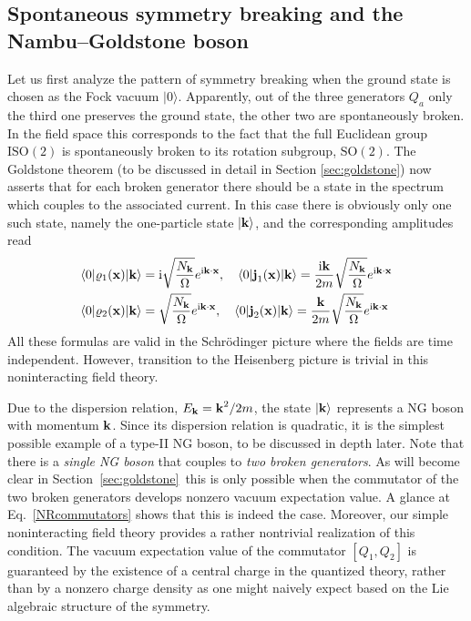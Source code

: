 \documentclass[final,3p,times,12pt,a4paper,sort&compress]{elsarticle}
\newcommand\gr[1]{\mathrm{#1}}              %
\newcommand\vek[1]{{\boldsymbol{\bf #1}}}   %
\newcommand\skal[2]{\vek{#1}\cdot\vek{#2}}  %
\newcommand\bra[1]{\langle#1\vert}          %
\newcommand\ket[1]{\vert#1\rangle}          %
\newcommand\imag{\mathrm i}                 %
\newcommand\vr{\varrho}
\begin{document}
\subsection{Spontaneous symmetry breaking and the Nambu--Goldstone boson}
Let us first analyze the pattern of symmetry breaking when the ground state is
chosen as the Fock vacuum $\ket0$. Apparently, out of the three generators $Q_a$
only the third one preserves the ground state, the other two are spontaneously
broken. In the field space this corresponds to the fact that the full Euclidean
group $\gr{ISO(2)}$ is spontaneously broken to its rotation subgroup,
$\gr{SO(2)}$. The Goldstone theorem (to be discussed in detail in Section
\ref{sec:goldstone}) now asserts that for each broken generator
there should be a state in the spectrum which couples to the associated current.
In this case there is obviously only one such state, namely the one-particle
state $\ket{\vek k}$, and the corresponding amplitudes read
\begin{equation}
\begin{split}
\bra0\vr_1(\vek x)\ket{\vek k}&=\imag
\sqrt{\frac{N_{\vek k}}{\Omega}}e^{\imag\skal kx},\quad
\bra0\vek j_1(\vek x)\ket{\vek k}=\frac{\imag\vek k}{2m}
\sqrt{\frac{N_{\vek k}}{\Omega}}e^{\imag\skal kx}\\
\bra0\vr_2(\vek x)\ket{\vek k}&=
\sqrt{\frac{N_{\vek k}}{\Omega}}e^{\imag\skal kx},\quad
\bra0\vek j_2(\vek x)\ket{\vek k}=\frac{\vek k}{2m}
\sqrt{\frac{N_{\vek k}}{\Omega}}e^{\imag\skal kx}
\end{split}
\end{equation}
All these formulas are valid in the Schr\"odinger picture where the fields are
time independent. However, transition to the Heisenberg picture is trivial in
this noninteracting field theory.

Due to the dispersion relation, $E_{\vek k}=\vek k^2/2m$, the state $\ket{\vek
k}$ represents a NG boson with momentum $\vek k$. Since its dispersion relation
is quadratic, it is the simplest possible example of a type-II NG boson,
to be discussed in depth later. Note that there is a \emph{single NG boson}
that couples to \emph{two broken generators}. As will become clear in
Section~\ref{sec:goldstone}\ this is only possible when the commutator of the
two broken generators develops nonzero vacuum expectation value. A glance at
Eq.~\eqref{NRcommutators} shows that this is indeed the case. Moreover, our
simple noninteracting field theory provides a rather nontrivial realization of
this condition. The vacuum expectation value of the commutator
$[Q_1,Q_2]$ is guaranteed by the existence of a central charge in the quantized
theory, rather than by a nonzero charge density as one might naively expect
based on the Lie algebraic structure of the symmetry.
\end{document}
